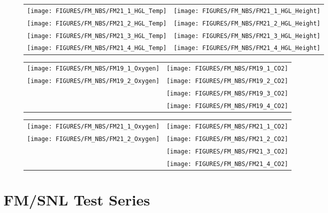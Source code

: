 \begin{figure}[p]
\begin{tabular*}{\textwidth}{l@{\extracolsep{\fill}}r}
\texttt{[image: FIGURES/FM\_NBS/FM21\_1\_HGL\_Temp]} &
\texttt{[image: FIGURES/FM\_NBS/FM21\_1\_HGL\_Height]} \\
\texttt{[image: FIGURES/FM\_NBS/FM21\_2\_HGL\_Temp]} &
\texttt{[image: FIGURES/FM\_NBS/FM21\_2\_HGL\_Height]} \\
\texttt{[image: FIGURES/FM\_NBS/FM21\_3\_HGL\_Temp]} &
\texttt{[image: FIGURES/FM\_NBS/FM21\_3\_HGL\_Height]} \\
\texttt{[image: FIGURES/FM\_NBS/FM21\_4\_HGL\_Temp]} &
\texttt{[image: FIGURES/FM\_NBS/FM21\_4\_HGL\_Height]}
\end{tabular*}
\end{figure}

\begin{figure}[p]
\begin{tabular*}{\textwidth}{l@{\extracolsep{\fill}}r}
\texttt{[image: FIGURES/FM\_NBS/FM19\_1\_Oxygen]} &
\texttt{[image: FIGURES/FM\_NBS/FM19\_1\_CO2]} \\
\texttt{[image: FIGURES/FM\_NBS/FM19\_2\_Oxygen]} &
\texttt{[image: FIGURES/FM\_NBS/FM19\_2\_CO2]} \\
 &
\texttt{[image: FIGURES/FM\_NBS/FM19\_3\_CO2]} \\
&
\texttt{[image: FIGURES/FM\_NBS/FM19\_4\_CO2]}
\end{tabular*}
\end{figure}

\begin{figure}[p]
\begin{tabular*}{\textwidth}{l@{\extracolsep{\fill}}r}
\texttt{[image: FIGURES/FM\_NBS/FM21\_1\_Oxygen]} &
\texttt{[image: FIGURES/FM\_NBS/FM21\_1\_CO2]} \\
\texttt{[image: FIGURES/FM\_NBS/FM21\_2\_Oxygen]} &
\texttt{[image: FIGURES/FM\_NBS/FM21\_2\_CO2]} \\
 &
\texttt{[image: FIGURES/FM\_NBS/FM21\_3\_CO2]} \\
&
\texttt{[image: FIGURES/FM\_NBS/FM21\_4\_CO2]}
\end{tabular*}
\end{figure}

\clearpage

\section{FM/SNL Test Series}


